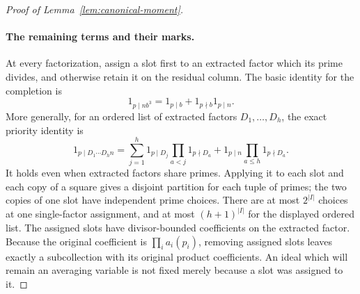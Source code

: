 \documentclass[11pt,a4paper]{article}
\numberwithin{equation}{section}
\numberwithin{figure}{section}
\theoremstyle{definition}
\theoremstyle{remark}
\begin{document}
\begin{proof}[Proof of Lemma~\ref{lem:canonical-moment}]
\paragraph{The remaining terms and their marks.}
At every factorization, assign a slot first to an extracted factor
which its prime divides, and otherwise retain it on the residual
column.  The basic identity for the completion is
\begin{equation}\label{old-eq:4.12}
 1_{p\mid nb^3}=1_{p\mid b}+1_{p\nmid b}1_{p\mid n}.
\end{equation}
More generally, for an ordered list of extracted factors
\(D_1,\ldots,D_h\), the exact priority identity is
\begin{equation}\label{eq:inverse-slot-priority}
 1_{p\mid D_1\cdots D_hn}
 =\sum_{j=1}^h1_{p\mid D_j}\prod_{a<j}1_{p\nmid D_a}
   +1_{p\mid n}\prod_{a\le h}1_{p\nmid D_a}.
\end{equation}
It holds even when extracted factors share primes.  Applying it to each
slot and each copy of a square gives a disjoint partition for each tuple
of primes; the two copies of one slot have independent prime choices.
There are at most \(2^{|I|}\) choices at one single-factor assignment,
and at most \((h+1)^{|I|}\) for the displayed ordered list.  The
assigned slots have divisor-bounded coefficients on the extracted
factor.  Because the original coefficient is
\(\prod_i a_i(p_i)\), removing assigned slots leaves exactly a
subcollection with its original product coefficients.  An ideal which
will remain an averaging variable is not fixed merely because a slot
was assigned to it.


\end{proof}
\end{document}
